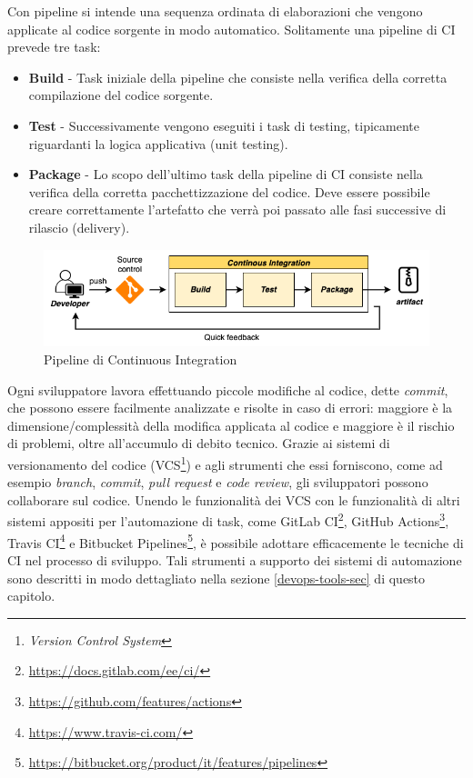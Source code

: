 Con pipeline si intende una sequenza ordinata di elaborazioni che vengono applicate al codice sorgente in modo automatico. Solitamente una pipeline di CI prevede tre task:

\begin{itemize}
    \item \textbf{Build} - Task iniziale della pipeline che consiste nella verifica della corretta compilazione del codice sorgente.
    \item \textbf{Test} - Successivamente vengono eseguiti i task di testing, tipicamente riguardanti la logica applicativa (unit testing).
    \item \textbf{Package} - Lo scopo dell'ultimo task della pipeline di CI consiste nella verifica della corretta pacchettizzazione del codice. Deve essere possibile creare correttamente l'artefatto che verrà poi passato alle fasi successive di rilascio (delivery).
\end{itemize}

\begin{figure}[H]
    \centering
    \includegraphics[width=1\textwidth]{img/ci-pipeline.png}
    \caption{Pipeline di Continuous Integration}
    \label{ci-pipeline}
\end{figure}

Ogni sviluppatore lavora effettuando piccole modifiche al codice, dette \textit{commit}, che possono essere facilmente analizzate e risolte in caso di errori: maggiore è la dimensione/complessità della modifica applicata al codice e maggiore è il rischio di problemi, oltre all'accumulo di debito tecnico. Grazie ai sistemi di versionamento del codice (VCS\footnote{\textit{Version Control System}}) e agli strumenti che essi forniscono, come ad esempio \textit{branch}, \textit{commit}, \textit{pull request} e \textit{code review}, gli sviluppatori possono collaborare sul codice. Unendo le funzionalità dei VCS con le funzionalità di altri sistemi appositi per l'automazione di task, come GitLab CI\footnote{\href{https://docs.gitlab.com/ee/ci/}{https://docs.gitlab.com/ee/ci/}}, GitHub Actions\footnote{\href{https://github.com/features/actions}{https://github.com/features/actions}}, Travis CI\footnote{\href{https://www.travis-ci.com/}{https://www.travis-ci.com/}} e Bitbucket Pipelines\footnote{\href{https://bitbucket.org/product/it/features/pipelines}{https://bitbucket.org/product/it/features/pipelines}}, è possibile adottare efficacemente le tecniche di CI nel processo di sviluppo. Tali strumenti a supporto dei sistemi di automazione sono descritti in modo dettagliato nella sezione \ref{devops-tools-sec} di questo capitolo.

